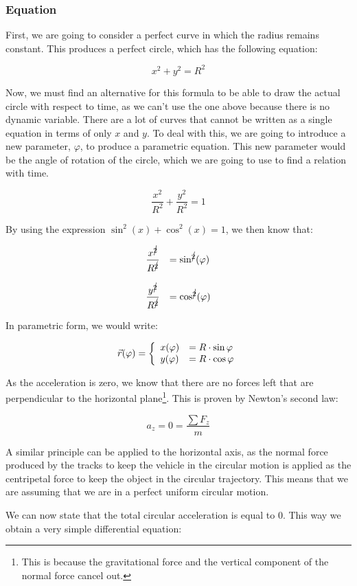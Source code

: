 \documentclass[12pt,twoside,a4paper]{article}
\newcommand{\ds}{\displaystyle}
\renewcommand{\phi}{\varphi}
\begin{document}
	\subsubsection{Equation}
	First, we are going to consider a perfect curve in which the radius remains constant. This produces a perfect circle, which has the following equation:
	
	$$x^2 + y^2 = R^2$$
	
	Now, we must find an alternative for this formula to be able to draw the actual circle with respect to time, as we can't use the one above because there is no dynamic variable. There are a lot of curves that cannot be written as a single equation in terms of only $x$ and $y$. To deal with this, we are going to introduce a new parameter, $\phi$, to produce a parametric equation. This new parameter would be the angle of rotation of the circle, which we are going to use to find a relation with time.
	
	$$\frac{x^2}{R^2} + \frac{y^2}{R^2} = 1$$
	
	By using the expression $\sin^2(x) + \cos^2(x) = 1$, we then know that:
	
	$$\begin{array}{ll} \ds \frac{x^{\cancel{2}}}{R^{\cancel{2}}} &= \sin^{\cancel{2}}(\phi) \cr\cr \ds \frac{y^{\cancel{2}}}{R^{\cancel{2}}} &= \cos^{\cancel{2}}(\phi) \end{array}$$
	
	In parametric form, we would write:
	
	$$\vec{r}(\phi) = \left\{\begin{array}{ll} x(\phi) &= R \cdot \sin{\phi} \cr y(\phi) &= R \cdot \cos{\phi} \end{array}\right.$$
	
	As the acceleration is zero, we know that there are no forces left that are perpendicular to the horizontal plane\footnote{This is because the gravitational force and the vertical component of the normal force cancel out.}. This is proven by Newton's second law:
	
	$$a_z = 0 = \frac{\sum F_z}{m}$$
	
	A similar principle can be applied to the horizontal axis, as the normal force produced by the tracks to keep the vehicle in the circular motion is applied as the centripetal force to keep the object in the circular trajectory. This means that we are assuming that we are in a perfect uniform circular motion.
	
	We can now state that the total circular acceleration is equal to $0$. This way we obtain a very simple differential equation:
	
\end{document}
